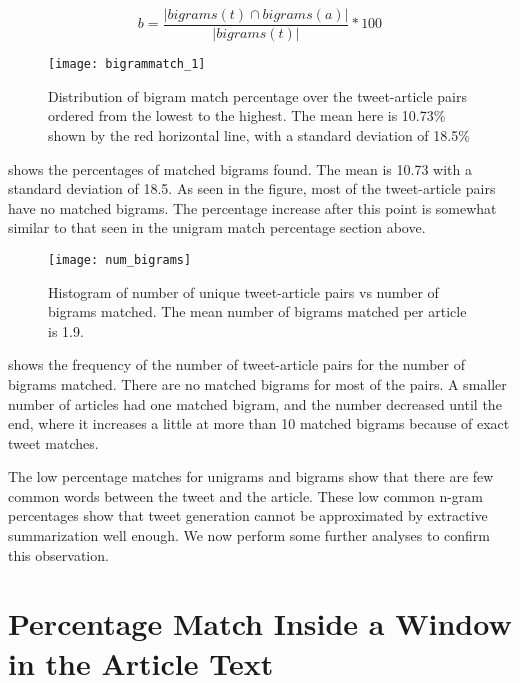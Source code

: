 \begin{equation}
b = \frac{| \textit{bigrams}(t) \cap \textit{bigrams}(a) |}{| \textit{bigrams}(t) |} * 100
\end{equation}

\begin{figure}[!t]
\centering
\texttt{[image: bigrammatch\_1]}
\caption[Bigram match percentages]{Distribution of bigram match percentage over the tweet-article pairs ordered from the lowest to the highest. The mean here is 10.73\% shown by the red horizontal line, with a standard deviation of 18.5\%}
\label{fig:bigrammatch}
\end{figure}

 shows the percentages of matched bigrams found. The mean is 10.73 with a standard deviation of 18.5. As seen in the figure, most of the tweet-article pairs have no matched bigrams. The percentage increase after this point is somewhat similar to that seen in the unigram match percentage section above.

\begin{figure}[!t]
\centering
\texttt{[image: num\_bigrams]}
\caption[Histogram for absolute number of matched bigrams.]{Histogram of number of unique tweet-article pairs vs number of bigrams matched. The mean number of bigrams matched per article is 1.9.}
\label{fig:num_bigrams}
\end{figure}

 shows the frequency of the number of tweet-article pairs for the number of bigrams matched. There are no matched bigrams for most of the pairs. A smaller number of articles had one matched bigram, and the number decreased until the end, where it increases a little at more than 10 matched bigrams because of exact tweet matches. 

The low percentage matches for unigrams and bigrams show that there are few common words between the tweet and the article. These low common n-gram percentages show that tweet generation cannot be approximated by extractive summarization well enough. We now perform some further analyses to confirm this observation.

\section{Percentage Match Inside a Window in the Article Text}
\label{sec:window}

